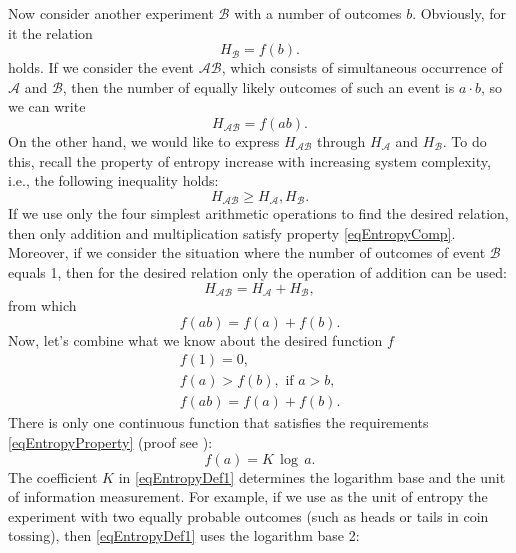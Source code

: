 Now consider another experiment $\mathcal{B}$ with a number of outcomes
$b$. Obviously, for it the relation
\[
H_{\mathcal{B}} = f\left(b\right).
\]
holds.
If we consider the event $\mathcal{A}\mathcal{B}$,
which consists of simultaneous occurrence of $\mathcal{A}$ and
$\mathcal{B}$, then the number of equally likely outcomes of such an
event is $a \cdot b$, so we can write
\[
H_{\mathcal{A}\mathcal{B}} = f\left(ab\right).
\]
On the other hand, we would like to express $H_{\mathcal{A}\mathcal{B}}$
through $H_{\mathcal{A}}$ and $H_{\mathcal{B}}$. To do this, recall
the property of entropy increase with increasing system complexity, i.e., the following inequality holds:
\begin{equation}
H_{\mathcal{A}\mathcal{B}} \ge H_{\mathcal{A}}, H_{\mathcal{B}}.
\label{eqEntropyComp}
\end{equation}
If we use only the four simplest arithmetic operations to find the desired relation, then only addition and multiplication satisfy property
\eqref{eqEntropyComp}. Moreover, if we consider the situation where the number
of outcomes of event $\mathcal{B}$ equals 1, then for the desired
relation only the operation of addition can be used:
\begin{equation}
H_{\mathcal{A}\mathcal{B}} = H_{\mathcal{A}} + H_{\mathcal{B}},
\nonumber
\end{equation}
from which
\begin{equation}
f\left(ab\right) = f\left(a\right) + f\left(b\right).
\nonumber
\end{equation}
Now, let's combine what we know about the desired function $f$
\begin{eqnarray}
f\left(1\right) = 0,
\nonumber \\
f\left(a\right) > f\left(b\right), \mbox{ if } a > b,
\nonumber \\
f\left(a b\right) = f\left(a\right) + f\left(b\right).
\label{eqEntropyProperty}
\end{eqnarray}
There is only one continuous function that satisfies
the requirements \eqref{eqEntropyProperty} (proof
see \cite{bYaglom}):
\begin{equation}
f\left(a\right) = K\,\log\,a.
\label{eqEntropyDef1}
\end{equation}
The coefficient $K$ in \eqref{eqEntropyDef1} determines the logarithm base and the unit
of information measurement. For example, if we use as the unit
of entropy the experiment with two equally probable outcomes (such as
heads or tails in coin tossing), then \eqref{eqEntropyDef1} uses the logarithm base 2:
